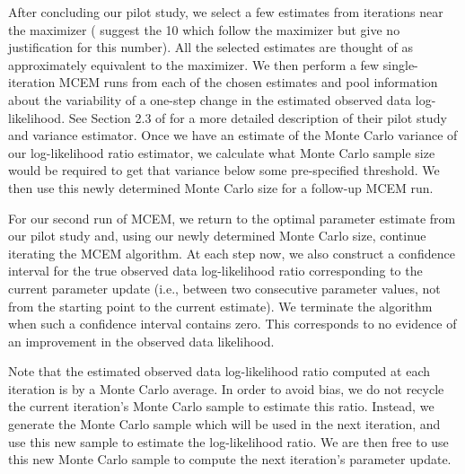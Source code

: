 \documentclass[11pt, oneside]{article}   	%
\begin{document}
After concluding our pilot study, we select a few estimates from iterations near the maximizer (\citeauthor{Cha95} suggest the 10 which follow the maximizer but give no justification for this number). All the selected estimates are thought of as approximately equivalent to the maximizer. We then perform a few single-iteration MCEM runs from each of the chosen estimates and pool information about the variability of a one-step change in the estimated observed data log-likelihood. See Section 2.3 of \citet{Cha95} for a more detailed description of their pilot study and variance estimator. Once we have an estimate of the Monte Carlo variance of our log-likelihood ratio estimator, we calculate what Monte Carlo sample size would be required to get that variance below some pre-specified threshold\footnotemark. We then use this newly determined Monte Carlo size for a follow-up MCEM run.



For our second run of MCEM, we return to the optimal parameter estimate from our pilot study and, using our newly determined Monte Carlo size, continue iterating the MCEM algorithm. At each step now, we also construct a confidence interval for the true observed data log-likelihood ratio corresponding to the current parameter update (i.e., between two consecutive parameter values, not from the starting point to the current estimate). We terminate the algorithm when such a confidence interval contains zero. This corresponds to no evidence of an improvement in the observed data likelihood.


Note that the estimated observed data log-likelihood ratio computed at each iteration is by a Monte Carlo average. In order to avoid bias, we do not recycle the current iteration's Monte Carlo sample to estimate this ratio. Instead, we generate the Monte Carlo sample which will be used in the next iteration, and use this new sample to estimate the log-likelihood ratio\footnotemark. We are then free to use this new Monte Carlo sample to compute the next iteration's parameter update. 

\end{document}
